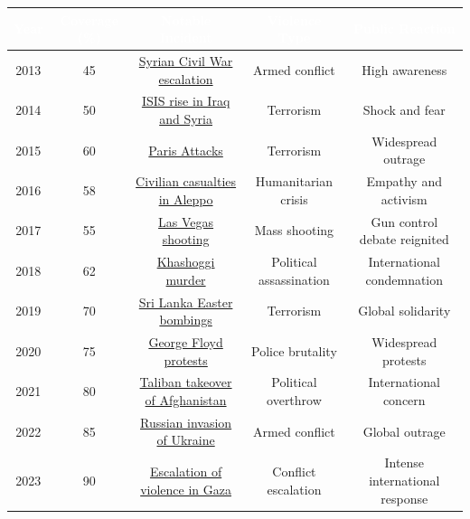 \documentclass[border=10pt]{standalone}
\begin{document}
\begin{tabular}{>{\columncolor{lightgray}}c|>{\columncolor{white}}c|>{\columncolor{white}}c|>{\columncolor{white}}c|>{\columncolor{white}}c}
\toprule
\rowcolor{darkred}\textcolor{white}{\textbf{Year}} & \textcolor{white}{\textbf{Coverage (\%)}} & \textcolor{white}{\textbf{Notable Incident}} & \textcolor{white}{\textbf{Violence Type}} & \textcolor{white}{\textbf{Public Reaction}} \\
\midrule
2013 & 45 & \ul{Syrian Civil War escalation} & Armed conflict & High awareness \\
2014 & 50 & \ul{ISIS rise in Iraq and Syria} & Terrorism & Shock and fear \\
2015 & 60 & \ul{Paris Attacks} & Terrorism & Widespread outrage \\
2016 & 58 & \ul{Civilian casualties in Aleppo} & Humanitarian crisis & Empathy and activism \\
2017 & 55 & \ul{Las Vegas shooting} & Mass shooting & Gun control debate reignited \\
2018 & 62 & \ul{Khashoggi murder} & Political assassination & International condemnation \\
2019 & 70 & \ul{Sri Lanka Easter bombings} & Terrorism & Global solidarity \\
2020 & 75 & \ul{George Floyd protests} & Police brutality & Widespread protests \\
2021 & 80 & \ul{Taliban takeover of Afghanistan} & Political overthrow & International concern \\
2022 & 85 & \ul{Russian invasion of Ukraine} & Armed conflict & Global outrage \\
2023 & 90 & \ul{Escalation of violence in Gaza} & Conflict escalation & Intense international response \\
\bottomrule
\end{tabular}
\end{document}
